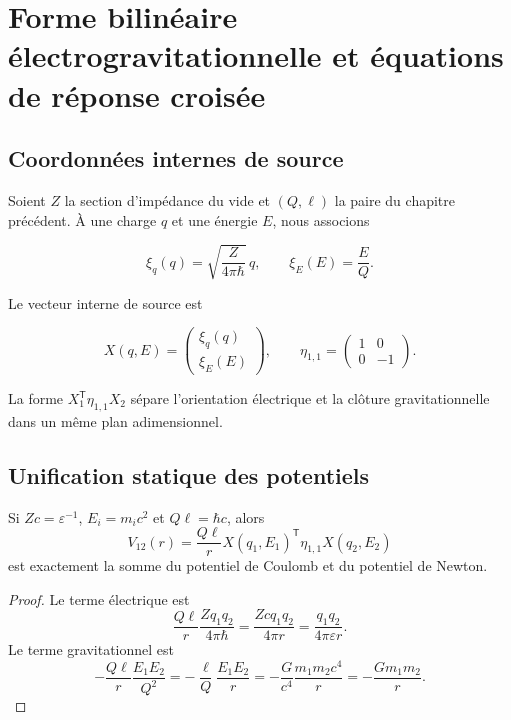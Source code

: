 \chapter{Forme bilinéaire électrogravitationnelle et équations de réponse croisée}
\label{chap:forma-electrogravitatoria}

\section{Coordonnées internes de source}

Soient \(Z\) la section d'impédance du vide et \((Q,\ell)\) la paire
du chapitre précédent. À une charge \(q\) et une énergie \(E\), nous associons

\[
\xi_q(q)=\sqrt{\frac{Z}{4\pi\hbar}}\,q,
\qquad
\xi_E(E)=\frac{E}{Q}.
\]

Le vecteur interne de source est

\[
X(q,E)=
\begin{pmatrix}\xi_q(q)\\ \xi_E(E)\end{pmatrix},
\qquad
\eta_{1,1}=
\begin{pmatrix}1&0\\0&-1\end{pmatrix}.
\]

La forme \(X_1^{\mathsf T}\eta_{1,1}X_2\) sépare l'orientation électrique et la
clôture gravitationnelle dans un même plan adimensionnel.

\section{Unification statique des potentiels}

\begin{theorem}
\label{thm:rm-emg-potential}
Si \(Zc=\varepsilon^{-1}\), \(E_i=m_ic^2\) et
\(Q\ell=\hbar c\), alors
\begin{equation}
\boxed{
V_{12}(r)=\frac{Q\ell}{r}
X(q_1,E_1)^{\mathsf T}\eta_{1,1}X(q_2,E_2)}
\label{eq:rm-emg-potential}
\end{equation}
est exactement la somme du potentiel de Coulomb et du potentiel de Newton.
\end{theorem}

\begin{proof}
Le terme électrique est
\[
\frac{Q\ell}{r}\frac{Zq_1q_2}{4\pi\hbar}
=\frac{Zcq_1q_2}{4\pi r}
=\frac{q_1q_2}{4\pi\varepsilon r}.
\]
Le terme gravitationnel est
\[
-\frac{Q\ell}{r}\frac{E_1E_2}{Q^2}
=-\frac{\ell}{Q}\frac{E_1E_2}{r}
=-\frac{G}{c^4}\frac{m_1m_2c^4}{r}
=-\frac{Gm_1m_2}{r}.
\]
\end{proof}

